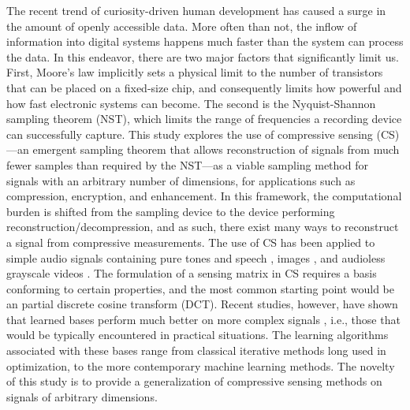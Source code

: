 The recent trend of curiosity-driven human development has caused a surge in the amount of openly accessible data. More often than not, the inflow of information into digital systems happens much faster than the system can process the data. In this endeavor, there are two major factors that significantly limit us. First, Moore's law implicitly sets a physical limit to the number of transistors that can be placed on a fixed-size chip, and consequently limits how powerful and how fast electronic systems can become. The second is the Nyquist-Shannon sampling theorem (NST), which limits the range of frequencies a recording device can successfully capture. This study explores the use of compressive sensing (CS)---an emergent sampling theorem that allows reconstruction of signals from much fewer samples than required by the NST---as a viable sampling method for signals with an arbitrary number of dimensions, for applications such as compression, encryption, and enhancement. In this framework, the computational burden is shifted from the sampling device to the device performing reconstruction/decompression, and as such, there exist many ways to reconstruct a signal from compressive measurements. The use of CS has been applied to simple audio signals containing pure tones \cite{Mathew2016,Andras2018} and speech \cite{Low2013,Low2018,Abrol2015}, images \cite{Mo2013,Zhou2016,Romero2016}, and audioless grayscale videos \cite{Liu2014,Chen2014}. The formulation of a sensing matrix in CS requires a basis conforming to certain properties, and the most common starting point would be an partial discrete cosine transform (DCT). Recent studies, however, have shown that learned bases perform much better on more complex signals \cite{Liu2013,Sharma2018,Eslahi2016}, i.e., those that would be typically encountered in practical situations. The learning algorithms associated with these bases range from classical iterative methods long used in optimization, to the more contemporary machine learning methods. The novelty of this study is to provide a generalization of compressive sensing methods on signals of arbitrary dimensions.


